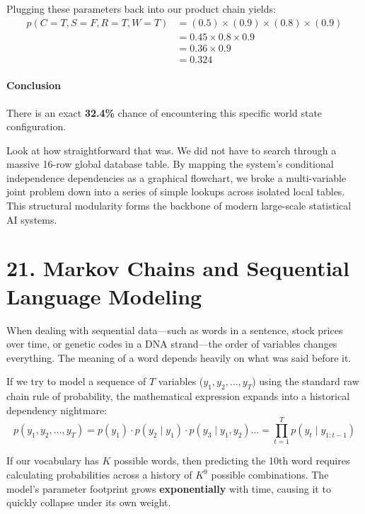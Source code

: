 \documentclass{article}
\begin{document}
Plugging these parameters back into our product chain yields:
\begin{align}
p(C=T, S=F, R=T, W=T) &= (0.5) \times (0.9) \times (0.8) \times (0.9) \nonumber \\
&= 0.45 \times 0.8 \times 0.9 \nonumber \\
&= 0.36 \times 0.9 \nonumber \\
&= \mathbf{0.324} \tag{134}
\end{align}

\paragraph{Conclusion}
There is an exact \textbf{32.4\%} chance of encountering this specific world state configuration. 

Look at how straightforward that was. We did not have to search through a massive 16-row global database table. By mapping the system's conditional independence dependencies as a graphical flowchart, we broke a multi-variable joint problem down into a series of simple lookups across isolated local tables. This structural modularity forms the backbone of modern large-scale statistical AI systems.

\section*{21. Markov Chains and Sequential Language Modeling}

When dealing with sequential data—such as words in a sentence, stock prices over time, or genetic codes in a DNA strand—the order of variables changes everything. The meaning of a word depends heavily on what was said before it. 

If we try to model a sequence of $T$ variables ($y_1, y_2, \dots, y_T$) using the standard raw chain rule of probability, the mathematical expression expands into a historical dependency nightmare:
\begin{equation}
p(y_1, y_2, \dots, y_T) = p(y_1) \cdot p(y_2 \mid y_1) \cdot p(y_3 \mid y_1, y_2) \dots = \prod_{t=1}^T p(y_t \mid y_{1:t-1}) \tag{135}
\end{equation}

If our vocabulary has $K$ possible words, then predicting the 10th word requires calculating probabilities across a history of $K^9$ possible combinations. The model's parameter footprint grows \textbf{exponentially} with time, causing it to quickly collapse under its own weight.
\end{document}
